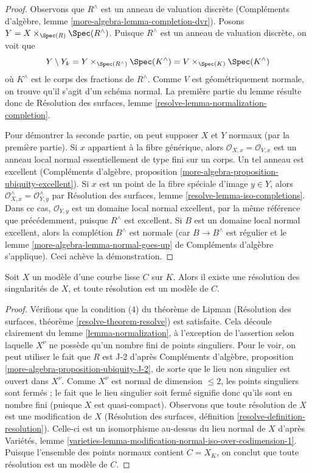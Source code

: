 \begin{proof}
Observons que $R^\wedge$ est un anneau de valuation discrète
(Compléments d'algèbre, lemme \ref{more-algebra-lemma-completion-dvr}).
Posons $Y = X \times_{\Spec(R)} \Spec(R^\wedge)$.
Puisque $R^\wedge$ est un anneau de valuation discrète, on voit que
$$
Y \setminus Y_k =
Y \times_{\Spec(R^\wedge)} \Spec(K^\wedge) =
V \times_{\Spec(K)} \Spec(K^\wedge)
$$
où $K^\wedge$ est le corps des fractions de $R^\wedge$.
Comme $V$ est géométriquement normale, on trouve qu'il s'agit
d'un schéma normal. La première partie du lemme résulte donc de
Résolution des surfaces, lemme \ref{resolve-lemma-normalization-completion}.

\medskip\noindent
Pour démontrer la seconde partie, on peut supposer $X$ et $Y$ normaux
(par la première partie). Si $x$ appartient à la fibre générique, alors
$\mathcal{O}_{X, x} = \mathcal{O}_{V, x}$ est un anneau local normal
essentiellement de type fini sur un corps. Un tel anneau est
excellent (Compléments d'algèbre, proposition
\ref{more-algebra-proposition-ubiquity-excellent}).
Si $x$ est un point de la fibre spéciale d'image $y \in Y$, alors
$\mathcal{O}_{X, x}^\wedge = \mathcal{O}_{Y, y}^\wedge$
par Résolution des surfaces, lemme \ref{resolve-lemma-iso-completions}.
Dans ce cas, $\mathcal{O}_{Y, y}$ est un domaine local normal excellent,
par la même référence que précédemment, puisque $R^\wedge$ est excellent.
Si $B$ est un domaine local normal excellent, alors la complétion
$B^\wedge$ est normale (car $B \to B^\wedge$ est régulier et le
lemme \ref{more-algebra-lemma-normal-goes-up} de Compléments d'algèbre s'applique).
Ceci achève la démonstration.
\end{proof}

\begin{lemma}
\label{lemma-regular}
Soit $X$ un modèle d'une courbe lisse $C$ sur $K$. Alors
il existe une résolution des singularités de $X$,
et toute résolution est un modèle de $C$.
\end{lemma}

\begin{proof}
Vérifions que la condition (4) du théorème de Lipman
(Résolution des surfaces, théorème \ref{resolve-theorem-resolve}) est satisfaite.
Cela découle clairement du lemme \ref{lemma-normalization},
à l'exception de l'assertion selon laquelle $X^\nu$ ne possède qu'un nombre fini de
points singuliers. Pour le voir, on peut utiliser le fait que $R$ est J-2 d'après
Compléments d'algèbre, proposition \ref{more-algebra-proposition-ubiquity-J-2},
de sorte que le lieu non singulier est ouvert dans $X^\nu$.
Comme $X^\nu$ est normal de dimension $\leq 2$, les points singuliers
sont fermés ; le fait que le lieu singulier soit fermé signifie donc
qu'ils sont en nombre fini (puisque $X$ est quasi-compact).
Observons que toute résolution de $X$ est une modification de $X$
(Résolution des surfaces, définition \ref{resolve-definition-resolution}).
Celle-ci est un isomorphisme au-dessus du lieu normal de $X$ d'après Variétés, lemme
\ref{varieties-lemma-modification-normal-iso-over-codimension-1}.
Puisque l'ensemble des points normaux contient
$C = X_K$, on conclut que toute résolution est un modèle de $C$.
\end{proof}

